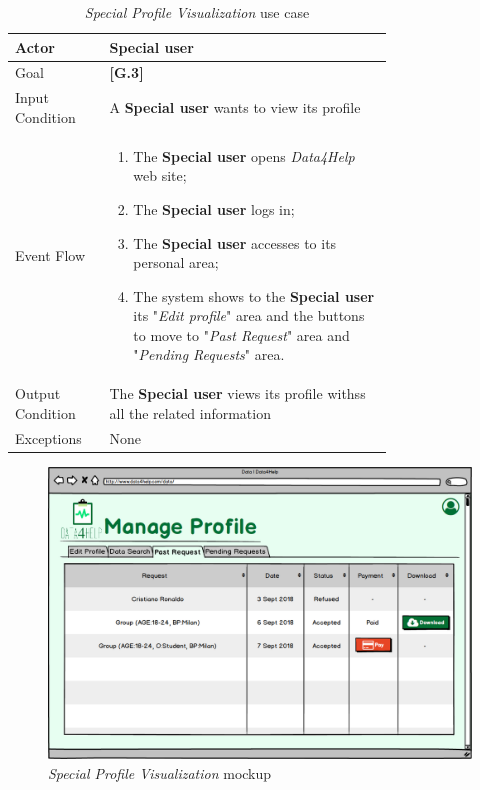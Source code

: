 \begin{center}
\begin{table}[H]
\begin{tabular}{ | l | p{0.75\linewidth} | }
  \hline
    Actor & \textbf{Special user} \\ \hline
    Goal & \textbf{[G.3]} \\ \hline
    Input Condition & A \textbf{Special user} wants to view its profile\\ \hline
    Event Flow & \begin{minipage}[t]{0.7\textwidth}
      \begin{enumerate}
        \item The \textbf{Special user } opens \textit{Data4Help} web site;
        \item The \textbf{Special user} logs in;
        \item The \textbf{Special user} accesses to its personal area;
        \item The system shows to the \textbf{Special user} its "\textit{Edit profile}" area and the buttons to move to "\textit{Past Request}" area and "\textit{Pending Requests}" area.
      \end{enumerate}
    \smallskip
  \end{minipage} \\ \hline
  Output Condition & The \textbf{Special user} views its profile withss all the related information\\ \hline
  Exceptions & None \\ \hline
\end{tabular}
\caption{\textit{Special Profile Visualization} use case}
\label{table:specialProfileVisualizationTable}
\end{table}
\end{center}

\begin{figure}[H]
\begin{center}
  \includegraphics[width=\textwidth]{img/mockup/Searched.png}
  \hspace{0.05\linewidth}
  \centering
  \caption{\textit{Special Profile Visualization} mockup}
  \label{img:specialProfileVisualizationMockup}
\end{center}
\end{figure}
